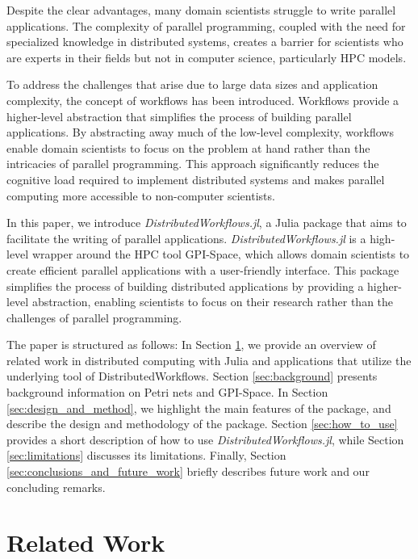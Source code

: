 \documentclass{juliacon}
\begin{document}
Despite the clear advantages, many domain scientists struggle to write parallel applications. 
The complexity of parallel programming, coupled with the need for specialized knowledge in distributed systems, creates a barrier for scientists who are experts in their fields but not in computer science, particularly HPC models.\vskip 6pt

To address the challenges that arise due to large data sizes and application complexity, the concept of workflows has been introduced. 
Workflows provide a higher-level abstraction that simplifies the process of building parallel applications. 
By abstracting away much of the low-level complexity, workflows enable domain scientists to focus on the problem at hand rather than the intricacies of parallel programming. 
This approach significantly reduces the cognitive load required to implement distributed systems and makes parallel computing more accessible to non-computer scientists.\vskip 6pt

In this paper, we introduce \emph{DistributedWorkflows.jl}\cite{DistributedWorkflows}, a Julia package that aims to facilitate the writing of parallel applications. 
\emph{DistributedWorkflows.jl} is a high-level wrapper around the HPC tool GPI-Space\cite{GSPC}, which allows domain scientists to create efficient parallel applications with a user-friendly interface. 
This package simplifies the process of building distributed applications by providing a higher-level abstraction, enabling scientists to focus on their research rather than the challenges of parallel programming.\vskip 6pt

The paper is structured as follows:
In Section \ref{sec:related_work}, we provide an overview of related work in distributed computing with Julia and applications that utilize the underlying tool of DistributedWorkflows.
Section \ref{sec:background} presents background information on Petri nets and GPI-Space. 
In Section \ref{sec:design_and_method}, we highlight the main features of the package, and describe the design and methodology of the package.
Section \ref{sec:how_to_use} provides a short description of how to use \emph{DistributedWorkflows.jl}, while Section \ref{sec:limitations} discusses its limitations. 
Finally, Section \ref{sec:conclusions_and_future_work} briefly describes future work and our concluding remarks.


\section{Related Work}
\label{sec:related_work}
\end{document}

